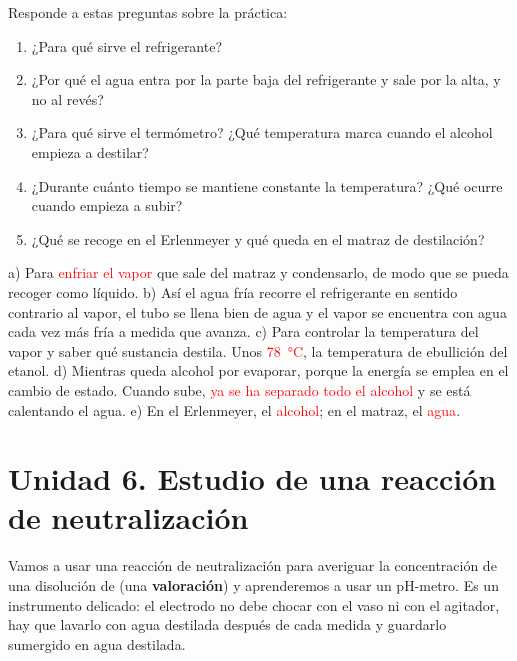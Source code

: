 \begin{exercise}
    Responde a estas preguntas sobre la práctica:
    \begin{enumerate}[label=\alph*)]
        \item ¿Para qué sirve el refrigerante?
        \item ¿Por qué el agua entra por la parte baja del refrigerante y sale por la alta, y no al revés?
        \item ¿Para qué sirve el termómetro? ¿Qué temperatura marca cuando el alcohol empieza a destilar?
        \item ¿Durante cuánto tiempo se mantiene constante la temperatura? ¿Qué ocurre cuando empieza a subir?
        \item ¿Qué se recoge en el Erlenmeyer y qué queda en el matraz de destilación?
    \end{enumerate}
    \begin{solu}
        a) Para \textcolor{red}{enfriar el vapor} que sale del matraz y condensarlo, de modo que se pueda recoger como líquido.
        b) Así el agua fría recorre el refrigerante en sentido contrario al vapor, el tubo se llena bien de agua y el vapor se encuentra con agua cada vez más fría a medida que avanza.
        c) Para controlar la temperatura del vapor y saber qué sustancia destila. Unos \textcolor{red}{\qty{78}{\celsius}}, la temperatura de ebullición del etanol.
        d) Mientras queda alcohol por evaporar, porque la energía se emplea en el cambio de estado. Cuando sube, \textcolor{red}{ya se ha separado todo el alcohol} y se está calentando el agua.
        e) En el Erlenmeyer, el \textcolor{red}{alcohol}; en el matraz, el \textcolor{red}{agua}.
    \end{solu}
\end{exercise}

\section{Unidad 6. Estudio de una reacción de neutralización}

Vamos a usar una reacción de neutralización para averiguar la concentración de una disolución de  (una \textbf{valoración}) y aprenderemos a usar un pH-metro. Es un instrumento delicado: el electrodo no debe chocar con el vaso ni con el agitador, hay que lavarlo con agua destilada después de cada medida y guardarlo sumergido en agua destilada.

